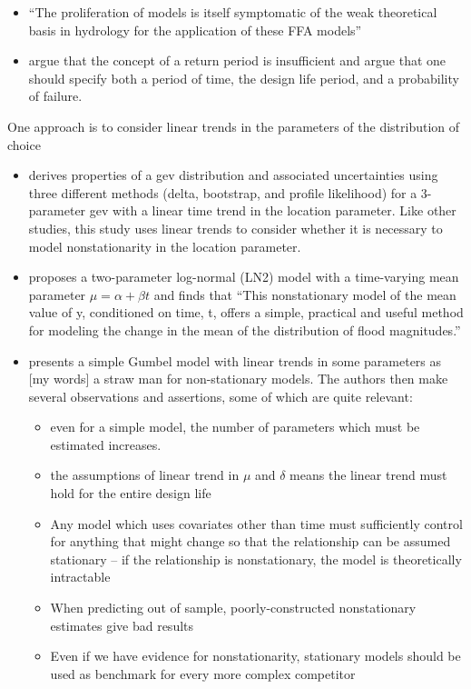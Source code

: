 \documentclass[11pt]{article}
\begin{document}
\begin{itemize}
  \item ``The proliferation of models is itself symptomatic of the weak theoretical basis in hydrology for the application of these FFA models'' \citep{Kidson2016}
  \item \citet{Rootzen2013} argue that the concept of a return period is insufficient and argue that one should specify both a period of time, the design life period, and a probability of failure.
\end{itemize}


One approach is to consider linear trends in the parameters of the distribution of choice
\begin{itemize}
  \item \citet{Obeysekera2014} derives properties of a {gev} distribution and associated uncertainties using three different methods (delta, bootstrap, and profile likelihood) for a 3-parameter {gev} with a linear time trend in the location parameter. Like other studies, this study uses linear trends to consider whether it is necessary to model nonstationarity in the location parameter.
  \item \citep{Vogel2011} proposes a two-parameter log-normal (LN2) model with a time-varying mean parameter $\mu = \alpha + \beta t$ and finds that ``This nonstationary model of the mean value of y, conditioned on time, t, offers a simple, practical and useful method for modeling the change in the mean of the distribution of flood magnitudes.''
  \item \citet{Serinaldi2015} presents a simple Gumbel model with linear trends in some parameters as [my words] a straw man for non-stationary models. The authors then make several observations and assertions, some of which are quite relevant:
  \begin{itemize}
    \item even for a simple model, the number of parameters which must be estimated increases.
    \item the assumptions of linear trend in $\mu$ and $\delta$ means the linear trend must hold for the entire design life
    \item Any model which uses covariates other than time must sufficiently control for anything that might change so that the relationship can be assumed stationary -- if the relationship is nonstationary, the model is theoretically intractable
    \item When predicting out of sample, poorly-constructed nonstationary estimates give bad results
    \item Even if we have evidence for nonstationarity, stationary models should be used as benchmark for every more complex competitor

\end{itemize}
\end{itemize}
\end{document}
